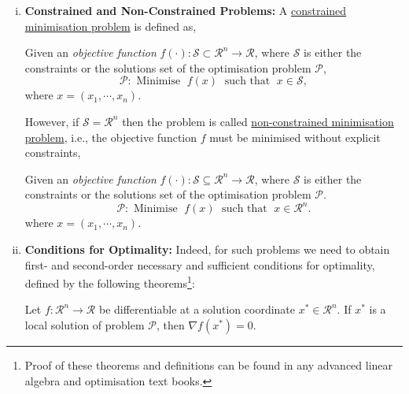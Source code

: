 \begin{enumerate}[i)]
\item {\bf Constrained and Non-Constrained Problems:} A \underline{constrained minimisation problem} is defined as,
\begin{shaded}
   Given an {\it objective function} $f\left(\cdot\right):\mathcal{S}\subset\mathcal{R}^{n}\rightarrow\mathcal{R}$, where $\mathcal{S}$ is either the constraints or the solutions set of the optimisation problem $\mathcal{P}$,
\begin{displaymath}
   \mathcal{P}: \text{ Minimise }\; f(x)\; \text{ such that }\; x\in\mathcal{S}, 
\end{displaymath}
where $x=\left(x_{1},\cdots,x_{n}\right)$.
\end{shaded}

However, if $\mathcal{S}=\mathcal{R}^{n}$ then the problem is called  \underline{non-constrained minimisation problem}, i.e., the objective function $f$ must be minimised without explicit constraints,
\begin{shaded}
   Given an {\it objective function} $f\left(\cdot\right):\mathcal{S}\subseteq\mathcal{R}^{n}\rightarrow\mathcal{R}$, where $\mathcal{S}$ is either the constraints or the solutions set of the optimisation problem $\mathcal{P}$.
\begin{displaymath}
    \mathcal{P}: \text{ Minimise }\; f(x)\; \text{ such that }\; x\in\mathcal{R}^{n}. 
\end{displaymath}
where $x=\left(x_{1},\cdots,x_{n}\right)$.
\end{shaded}

\item {\bf Conditions for Optimality:} Indeed, for such problems we need to obtain first- and second-order necessary and sufficient conditions for optimality, defined by the following theorems\footnote{Proof of these theorems and definitions can be found in any advanced linear algebra and optimisation text books.}:

\begin{thm}\label{Chapter:GlobalOpt:TheoremFirstOrder}
Let $f:\mathcal{R}^{n}\rightarrow\mathcal{R}$ be differentiable at a solution coordinate $x^{\ast}\in\mathcal{R}^{n}$. If $x^{\ast}$ is a local solution of problem $\mathcal{P}$, then $\nabla f\left(x^{\ast}\right)=0$.
\end{thm}


\end{enumerate}
